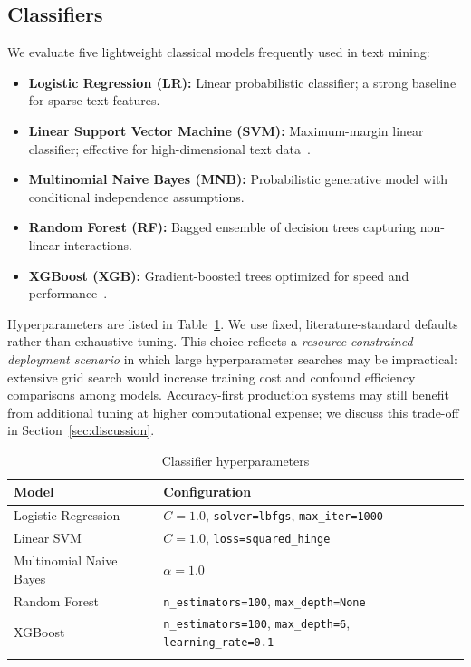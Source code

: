 \documentclass[pdflatex,sn-mathphys-num]{sn-jnl}
\begin{document}
\subsection{Classifiers}

We evaluate five lightweight classical models frequently used in text mining:
\begin{itemize}
    \item \textbf{Logistic Regression (LR):} Linear probabilistic classifier; a strong baseline for sparse text features.
    \item \textbf{Linear Support Vector Machine (SVM):} Maximum-margin linear classifier; effective for high-dimensional text data~\cite{joachims1998text}.
    \item \textbf{Multinomial Naive Bayes (MNB):} Probabilistic generative model with conditional independence assumptions.
    \item \textbf{Random Forest (RF):} Bagged ensemble of decision trees capturing non-linear interactions.
    \item \textbf{XGBoost (XGB):} Gradient-boosted trees optimized for speed and performance~\cite{chen2016xgboost}.
\end{itemize}

Hyperparameters are listed in Table~\ref{tab:hyperparams}. We use fixed, literature-standard defaults rather than exhaustive tuning. This choice reflects a \emph{resource-constrained deployment scenario} in which large hyperparameter searches may be impractical: extensive grid search would increase training cost and confound efficiency comparisons among models. Accuracy-first production systems may still benefit from additional tuning at higher computational expense; we discuss this trade-off in Section~\ref{sec:discussion}.

\begin{table}[t]
\caption{Classifier hyperparameters}\label{tab:hyperparams}
\begin{tabular}{@{}ll@{}}
\toprule
Model & Configuration \\
\midrule
Logistic Regression & $C=1.0$, \texttt{solver=lbfgs}, \texttt{max\_iter=1000} \\
Linear SVM & $C=1.0$, \texttt{loss=squared\_hinge} \\
Multinomial Naive Bayes & $\alpha=1.0$ \\
Random Forest & \texttt{n\_estimators=100}, \texttt{max\_depth=None} \\
XGBoost & \texttt{n\_estimators=100}, \texttt{max\_depth=6}, \texttt{learning\_rate=0.1} \\
\botrule
\end{tabular}
\end{table}
\end{document}
